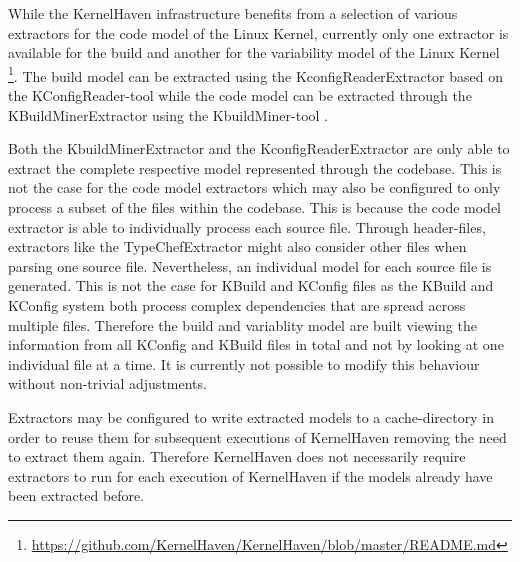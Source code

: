 \documentclass[a4paper]{article}
\begin{document}
While the KernelHaven infrastructure benefits from a selection of various extractors for the code model of the Linux Kernel, currently only one extractor is available for the build and another for the variability model of the Linux Kernel \footnote{\url{https://github.com/KernelHaven/KernelHaven/blob/master/README.md}}. The build model can be extracted using the KconfigReaderExtractor based on the KConfigReader-tool \cite{ck-kconfig} while the code model can be extracted through the KBuildMinerExtractor using the KbuildMiner-tool \cite{ck-kbuild}.

Both the KbuildMinerExtractor and the KconfigReaderExtractor are only able to extract the complete respective model represented through the codebase. This is not the case for the code model extractors which may also be configured to only process a subset of the files within the codebase. This is because the code model extractor is able to individually process each source file. Through header-files, extractors like the TypeChefExtractor might also consider other files when parsing one source file. Nevertheless, an individual model for each source file is generated. This is not the case for KBuild and KConfig files as the KBuild and KConfig system both process complex dependencies that are spread across multiple files. Therefore the build and variablity model are built viewing the information from all KConfig and KBuild files in total and not by looking at one individual file at a time. It is currently not possible to modify this behaviour without non-trivial adjustments.

Extractors may be configured to write extracted models to a cache-directory in order to reuse them for subsequent executions of KernelHaven removing the need to extract them again. Therefore KernelHaven does not necessarily require extractors to run for each execution of KernelHaven if the models already have been extracted before.
\end{document}
